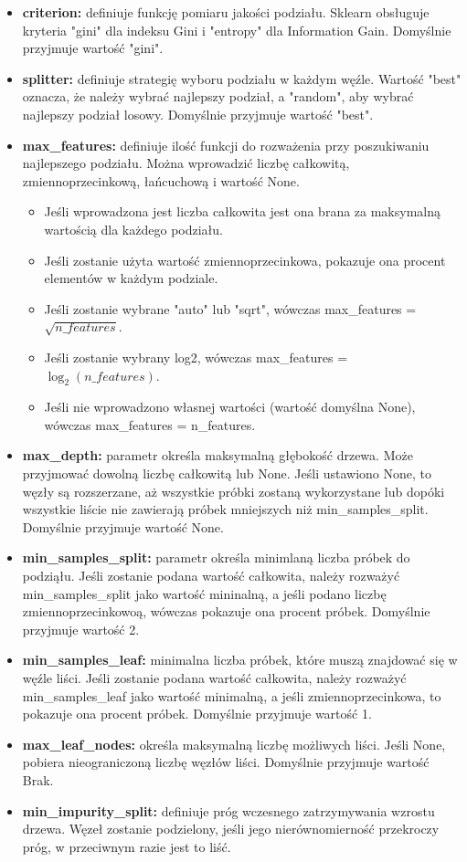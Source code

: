 \documentclass[10pt,a4paper]{article}
\begin{document}
\begin{itemize}
	\item \textbf{criterion:} definiuje funkcję pomiaru jakości podziału. Sklearn obsługuje kryteria "gini" dla indeksu Gini i "entropy" dla Information Gain. Domyślnie przyjmuje wartość "gini".
	\item \textbf{splitter:} definiuje strategię wyboru podziału w każdym węźle. Wartość "best" oznacza, że należy wybrać najlepszy podział, a "random", aby wybrać najlepszy podział losowy. Domyślnie przyjmuje wartość "best".
	\item \textbf{max\_features:} definiuje ilość funkcji do rozważenia przy poszukiwaniu najlepszego podziału. Można wprowadzić liczbę całkowitą, zmiennoprzecinkową, łańcuchową i wartość None.
	\begin{itemize}
		\item Jeśli wprowadzona jest liczba całkowita jest ona brana za maksymalną wartością dla każdego podziału.
		\item Jeśli zostanie użyta wartość zmiennoprzecinkowa, pokazuje ona procent elementów w każdym podziale.
		\item Jeśli zostanie wybrane "auto" lub "sqrt", wówczas max\_features = $\sqrt{n\_features}$.
		\item Jeśli zostanie wybrany log2, wówczas max\_features = $\log_2{(n\_features)}$.
		\item Jeśli nie wprowadzono własnej wartości (wartość domyślna None), wówczas max\_features = n\_features.
	\end{itemize}

	\item \textbf{max\_depth:} parametr określa maksymalną głębokość drzewa. Może przyjmować dowolną liczbę całkowitą lub None. Jeśli ustawiono None, to węzły są rozszerzane, aż wszystkie próbki zostaną wykorzystane lub dopóki wszystkie liście nie zawierają próbek mniejszych niż min\_samples\_split. Domyślnie przyjmuje wartość None.
	\item \textbf{min\_samples\_split:} parametr określa minimlaną liczba próbek do podziąłu. Jeśli zostanie podana wartość całkowita, należy rozważyć min\_samples\_split jako wartość mininalną, a jeśli podano liczbę zmiennoprzecinkowoą, wówczas pokazuje ona procent próbek. Domyślnie przyjmuje wartość 2.
	\item \textbf{min\_samples\_leaf:} minimalna liczba próbek, które muszą znajdować się w węźle liści. Jeśli zostanie podana wartość całkowita, należy rozważyć min\_samples\_leaf jako wartość minimalną, a jeśli zmiennoprzecinkowa, to pokazuje ona procent próbek. Domyślnie przyjmuje wartość 1.
	\item \textbf{max\_leaf\_nodes:} określa maksymalną liczbę możliwych liści. Jeśli None, pobiera nieograniczoną liczbę węzłów liści. Domyślnie przyjmuje wartość Brak.
	\item \textbf{min\_impurity\_split:} definiuje próg wczesnego zatrzymywania wzrostu drzewa. Węzeł zostanie podzielony, jeśli jego nierównomierność przekroczy próg, w przeciwnym razie jest to liść.
\end{itemize}
\vskip 0.2in
\end{document}
